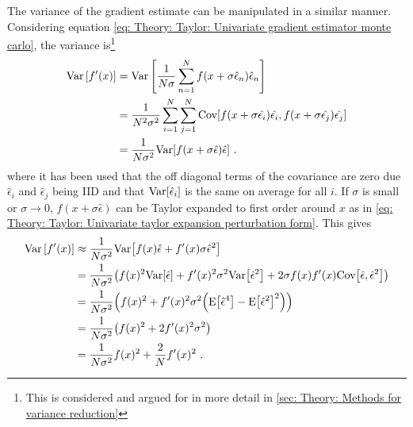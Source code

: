The variance of the gradient estimate can be manipulated in a similar manner. Considering  equation \eqref{eq: Theory: Taylor: Univariate gradient estimator monte carlo}, the variance is\footnote{This is considered and argued for in more detail in \autoref{sec: Theory: Methods for variance reduction}}
\begin{align} %
    \text{Var}\left[f'(x)\right]
    &= \text{Var}\left[\frac{1}{N\sigma}\sum_{n=1}^N f(x+\sigma\hat{\epsilon}_n)\hat{\epsilon}_n\right]\nonumber\\
    &= \frac{1}{N^2\sigma^2}\sum_{i=1}^N\sum_{j=1}^N\text{Cov}\bra{f(x+\sigma\hat{\epsilon_i})\hat{\epsilon_i},f(x+\sigma\hat{\epsilon_j})\hat{\epsilon_j}} \nonumber\\
    &= \frac{1}{N\sigma^2}\text{Var}\bra{f(x+\sigma\hat{\epsilon})\hat{\epsilon}} \ . 
\end{align}
where it has been used that the off diagonal terms of the covariance are zero due $\hat{\epsilon}_i$ and $\hat{\epsilon}_j$ being \gls{IID} and that $\text{Var}{\left[\hat{\epsilon}_i\right]}$ is the same on average for all $i$. If $\sigma$ is small or $\sigma\rightarrow0$, $f(x+\sigma\hat{\epsilon})$ can be Taylor expanded to first order around $x$ as in \eqref{eq: Theory: Taylor: Univariate taylor expansion perturbation form}. This gives
\begin{align}
    \text{Var}\left[f'(x)\right]
    &\approx \frac{1}{N\sigma^2}\text{Var}{\left[f(x)\hat{\epsilon} + f'(x)\sigma\hat{\epsilon}^2\right]} \nonumber\\
    &= \frac{1}{N\sigma^2}{\left(f(x)^2\text{Var}{\left[\hat{\epsilon}\right]} + f'(x)^2\sigma^2\text{Var}{\left[\hat{\epsilon}^2\right]} + 2\sigma f(x)f'(x)\text{Cov}{\left[\hat{\epsilon},\hat{\epsilon}^2\right]}\right)} \nonumber\\
    &= \frac{1}{N\sigma^2}{\left(f(x)^2 + f'(x)^2\sigma^2{\left(\text{E}{\left[\hat{\epsilon}^4\right]} - \text{E}{\left[\hat{\epsilon}^2\right]}^2\right)}\right)} \nonumber\\
    &= \frac{1}{N\sigma^2}{\left(f(x)^2 + 2f'(x)^2\sigma^2\right)}\nonumber\\
    &= \frac{1}{N\sigma^2}f(x)^2 + \frac{2}{N}f'(x)^2 \ . \label{eq: Theory: Taylor: Variance of univariate gradient}
\end{align}
